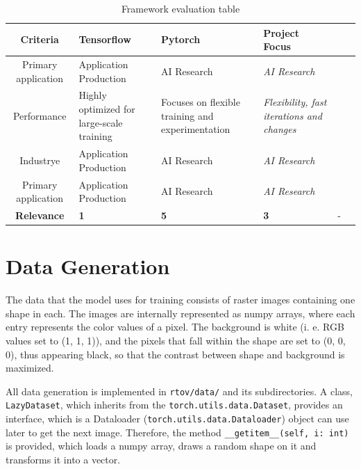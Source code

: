 \documentclass[12pt, a4paper, titlepage]{report}
\begin{document}
\begin{table}
   \begin{tabular} {|c||p{1.5cm}|p{2.0cm}|p{1.5cm}|p{2.5cm}||p{2.2cm}|}
      \hline
      \textbf{Criteria}    & \textbf{Tensorflow} & \textbf{Pytorch} & \textbf{Project Focus} \\
      \hline
      Primary application  & Application Production & AI Research & \emph{AI Research} \\ \hline
      Performance          & Highly optimized for large-scale training & Focuses on flexible training and experimentation & \emph{Flexibility, fast iterations and changes} \\ \hline
      Industrye  & Application Production & AI Research & \emph{AI Research} \\ \hline
      Primary application  & Application Production & AI Research & \emph{AI Research} \\ \hline
      \hline\hline
      \textbf{Relevance} & \textbf{1} & \textbf{5} & \textbf{3} & - & \\
      \hline
   \end{tabular}
   \caption{Framework evaluation table}
   \label{table:framework_evaluation}
\end{table}

\vspace{0.5cm}

\section{Data Generation}

The data that the model uses for training consists of raster images containing one shape in each. The images are internally represented as numpy arrays, where each entry represents the color values of a pixel. The background is white (i. e. RGB values set to (1, 1, 1)), and the pixels that fall within the shape are set to (0, 0, 0), thus appearing black, so that the contrast between shape and background is maximized.

All data generation is implemented in \lstinline{rtov/data/} and its subdirectories. A class, \lstinline{LazyDataset}, which inherits from the \lstinline{torch.utils.data.Dataset}, provides an interface, which is a Dataloader (\lstinline{torch.utils.data.Dataloader}) object can use later to get the next image. Therefore, the method \lstinline{__getitem__(self, i: int)} is provided, which loads a numpy array, draws a random shape on it and transforms it into a vector.
\end{document}
